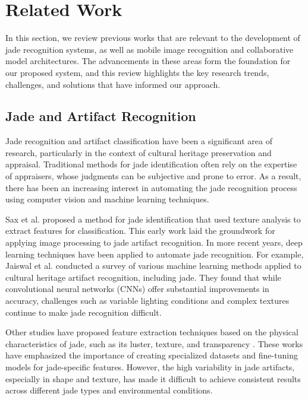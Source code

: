 \section{Related Work}
In this section, we review previous works that are relevant to the development of jade recognition systems, as well as mobile image recognition and collaborative model architectures. The advancements in these areas form the foundation for our proposed system, and this review highlights the key research trends, challenges, and solutions that have informed our approach.

\subsection{Jade and Artifact Recognition}

Jade recognition and artifact classification have been a significant area of research, particularly in the context of cultural heritage preservation and appraisal. Traditional methods for jade identification often rely on the expertise of appraisers, whose judgments can be subjective and prone to error. As a result, there has been an increasing interest in automating the jade recognition process using computer vision and machine learning techniques.

Sax et al. \cite{sax2004identification} proposed a method for jade identification that used texture analysis to extract features for classification. This early work laid the groundwork for applying image processing to jade artifact recognition. In more recent years, deep learning techniques have been applied to automate jade recognition. For example, Jaiswal et al. \cite{jaiswal2020survey} conducted a survey of various machine learning methods applied to cultural heritage artifact recognition, including jade. They found that while convolutional neural networks (CNNs) offer substantial improvements in accuracy, challenges such as variable lighting conditions and complex textures continue to make jade recognition difficult.

Other studies have proposed feature extraction techniques based on the physical characteristics of jade, such as its luster, texture, and transparency \cite{jiawei2022analysis}. These works have emphasized the importance of creating specialized datasets and fine-tuning models for jade-specific features. However, the high variability in jade artifacts, especially in shape and texture, has made it difficult to achieve consistent results across different jade types and environmental conditions.

